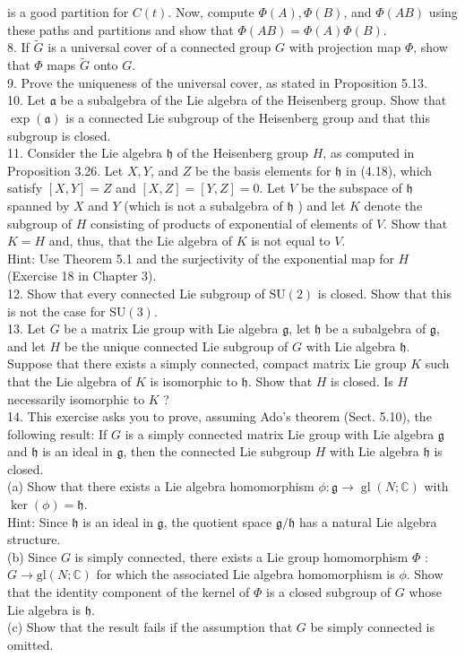 \documentclass[10pt, letterpaper]{article}
\begin{document}
is a good partition for $C(t)$. Now, compute $\Phi(A), \Phi(B)$, and $\Phi(A B)$ using these paths and partitions and show that $\Phi(A B)=\Phi(A) \Phi(B)$.\\
8. If $\tilde{G}$ is a universal cover of a connected group $G$ with projection map $\Phi$, show that $\Phi$ maps $\tilde{G}$ onto $G$.\\
9. Prove the uniqueness of the universal cover, as stated in Proposition 5.13.\\
10. Let $\mathfrak{a}$ be a subalgebra of the Lie algebra of the Heisenberg group. Show that $\exp (\mathfrak{a})$ is a connected Lie subgroup of the Heisenberg group and that this subgroup is closed.\\
11. Consider the Lie algebra $\mathfrak{h}$ of the Heisenberg group $H$, as computed in Proposition 3.26. Let $X, Y$, and $Z$ be the basis elements for $\mathfrak{h}$ in (4.18), which satisfy $[X, Y]=Z$ and $[X, Z]=[Y, Z]=0$. Let $V$ be the subspace of $\mathfrak{h}$ spanned by $X$ and $Y$ (which is not a subalgebra of $\mathfrak{h}$ ) and let $K$ denote the subgroup of $H$ consisting of products of exponential of elements of $V$. Show that $K=H$ and, thus, that the Lie algebra of $K$ is not equal to $V$.\\
Hint: Use Theorem 5.1 and the surjectivity of the exponential map for $H$ (Exercise 18 in Chapter 3).\\
12. Show that every connected Lie subgroup of $\mathrm{SU}(2)$ is closed. Show that this is not the case for $\mathrm{SU}(3)$.\\
13. Let $G$ be a matrix Lie group with Lie algebra $\mathfrak{g}$, let $\mathfrak{h}$ be a subalgebra of $\mathfrak{g}$, and let $H$ be the unique connected Lie subgroup of $G$ with Lie algebra $\mathfrak{h}$. Suppose that there exists a simply connected, compact matrix Lie group $K$ such that the Lie algebra of $K$ is isomorphic to $\mathfrak{h}$. Show that $H$ is closed. Is $H$ necessarily isomorphic to $K$ ?\\
14. This exercise asks you to prove, assuming Ado's theorem (Sect. 5.10), the following result: If $G$ is a simply connected matrix Lie group with Lie algebra $\mathfrak{g}$ and $\mathfrak{h}$ is an ideal in $\mathfrak{g}$, then the connected Lie subgroup $H$ with Lie algebra $\mathfrak{h}$ is closed.\\
(a) Show that there exists a Lie algebra homomorphism $\phi: \mathfrak{g} \rightarrow \operatorname{gl}(N ; \mathbb{C})$ with $\operatorname{ker}(\phi)=\mathfrak{h}$.\\
Hint: Since $\mathfrak{h}$ is an ideal in $\mathfrak{g}$, the quotient space $\mathfrak{g} / \mathfrak{h}$ has a natural Lie algebra structure.\\
(b) Since $G$ is simply connected, there exists a Lie group homomorphism $\Phi$ : $G \rightarrow \mathrm{gl}(N ; \mathbb{C})$ for which the associated Lie algebra homomorphism is $\phi$. Show that the identity component of the kernel of $\Phi$ is a closed subgroup of $G$ whose Lie algebra is $\mathfrak{h}$.\\
(c) Show that the result fails if the assumption that $G$ be simply connected is omitted.



\pagebreak
\printbibliography
\end{document}
